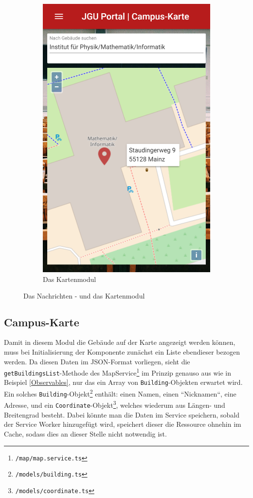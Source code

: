 \begin{figure}
\begin{subfigure}{.5\textwidth}
  \includegraphics[width=.8\linewidth]{gfx/Map}
  \caption{Das Kartenmodul}
  \label{fig:map}
\end{subfigure}
\caption{Das Nachrichten - und das Kartenmodul}
\label{fig:news+map}
\end{figure}

\subsection{Campus-Karte}
\label{sec:prog:map}
Damit in diesem Modul die Gebäude auf der Karte angezeigt werden können, muss bei Initialisierung der Komponente zunächst ein Liste ebendieser bezogen werden. Da diesen Daten im \acs{JSON}-Format vorliegen, sieht die \texttt{getBuildingsList}-Methode des MapService\footnote{\texttt{/map/map.service.ts}} im Prinzip genauso aus wie in Beispiel \ref{Observables}, nur das ein Array von \texttt{Building}-Objekten erwartet wird. Ein solches \texttt{Building}-Objekt\footnote{\texttt{/models/building.ts}} enthält: einen Namen, einen ``Nicknamen``, eine Adresse, und ein \texttt{Coordinate}-Objekt\footnote{\texttt{/models/coordinate.ts}}, welches wiederum aus Längen- und Breitengrad besteht. Dabei könnte man die Daten im Service speichern, sobald der Service Worker hinzugefügt wird, speichert dieser die Ressource ohnehin im Cache, sodass dies an dieser Stelle nicht notwendig ist.

